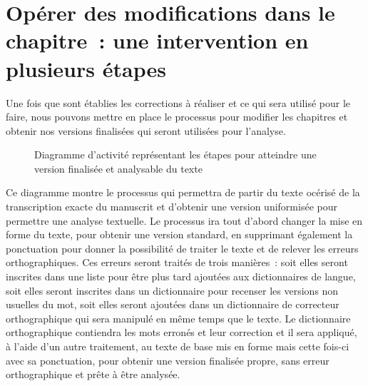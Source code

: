 \section{Opérer des modifications dans le chapitre~: une intervention en plusieurs étapes}
Une fois que sont établies les corrections à réaliser et ce qui sera utilisé pour le faire, nous pouvons mettre en place le processus pour modifier les chapitres et obtenir nos versions finalisées qui seront utilisées pour l'analyse.
\begin{figure}[H]
    \centering
    \caption{Diagramme d'activité représentant les étapes pour atteindre une version finalisée et analysable du texte}
    \label{fig:etapestotales}
\end{figure}
Ce diagramme montre le processus qui permettra de partir du texte océrisé de la transcription exacte du manuscrit et d'obtenir une version uniformisée pour permettre une analyse textuelle. Le processus ira tout d'abord changer la mise en forme du texte, pour obtenir une version standard, en supprimant également la ponctuation pour donner la possibilité de traiter le texte et de relever les erreurs orthographiques. Ces erreurs seront traités de trois manières~: soit elles seront inscrites dans une liste pour être plus tard ajoutées aux dictionnaires de langue, soit elles seront inscrites dans un dictionnaire pour recenser les versions non usuelles du mot, soit elles seront ajoutées dans un dictionnaire de correcteur orthographique qui sera manipulé en même temps que le texte. Le dictionnaire orthographique contiendra les mots erronés et leur correction et il sera appliqué, à l'aide d'un autre traitement, au texte de base mis en forme mais cette fois-ci avec sa ponctuation, pour obtenir une version finalisée propre, sans erreur orthographique et prête à être analysée.

